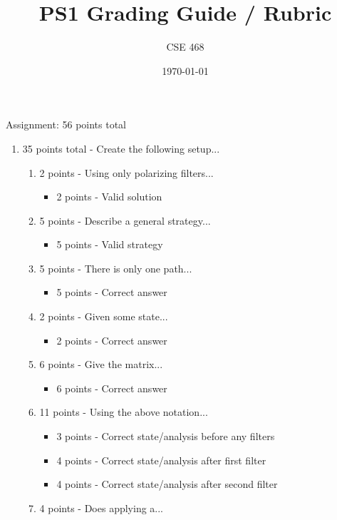 \documentclass[12pt]{article}
\title{PS1 Grading Guide / Rubric}
\author{CSE 468}
\date{\today}
\begin{document}
\maketitle

Assignment: 56 points total
\begin{enumerate}[font=\bfseries]
    \item 35 points total - Create the following setup...
    \begin{enumerate}
        \item 2 points - Using only polarizing filters...
        \begin{itemize}
            \item 2 points - Valid solution
        \end{itemize}
        \item 5 points - Describe a general strategy...
        \begin{itemize}
            \item 5 points - Valid strategy
        \end{itemize}
        \item 5 points - There is only one path...
        \begin{itemize}
            \item 5 points - Correct answer
        \end{itemize}
        \item 2 points - Given some state...
        \begin{itemize}
            \item 2 points - Correct answer
        \end{itemize}
        \item 6 points - Give the matrix...
        \begin{itemize}
            \item 6 points - Correct answer
        \end{itemize}
        \item 11 points - Using the above notation...
        \begin{itemize}
            \item 3 points - Correct state/analysis before any filters
            \item 4 points - Correct state/analysis after first filter
            \item 4 points - Correct state/analysis after second filter
        \end{itemize}
        \item 4 points - Does applying a...

\end{enumerate}
\end{enumerate}
\end{document}

